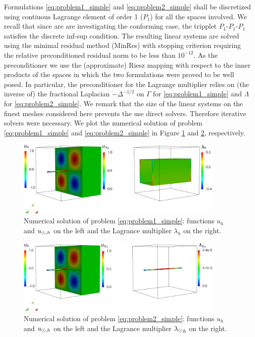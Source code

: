 Formulations \eqref{eq:problem1_simple} and \eqref{eq:problem2_simple} shall
be discretized using contiuous Lagrange element of order 1 ($P_1$) for all the spaces
involved. We recall that since are are investigating the conforming case, the tripplet
$P_1$-$P_1$-$P_1$ satisfies
the discrete inf-sup condition. The resulting linear systems are solved
using the minimal residual method (MinRes) with stopping criterion requiring the relative
preconditioned residual norm to be less than $10^{-12}$. As the preconditioner
we use the (approximate) Riesz mapping with respect to the inner products of
the spaces in which the two formulations were proved to be well posed.
In particular, the preconditioner for the Lagrange multiplier relies on
(the inverse of) the fractional Laplacian $-\Delta^{-1/2}$ on $\Gamma$ for
\eqref{eq:problem1_simple} and $\Lambda$ for \eqref{eq:problem2_simple}.
We remark that the size of the linear systems on the finest meshes considered
here prevents the use direct solvers. Therefore iterative solvers were necessary. We plot the numerical solution of problem \eqref{eq:problem1_simple} and \eqref{eq:problem2_simple} in Figure \ref{fig:sol_benchm1} and \ref{fig:sol_benchm2}, respectively. 

\begin{figure}
\centering
\includegraphics[width = 0.9\textwidth]{./graphics/mfs_LM2d}
\caption{Numerical solution of problem \eqref{eq:problem1_simple}: functions $u_h$ and $u_{\odot, h}$ on the left and the Lagrance multiplier $\lambda_h$ on the right.}\label{fig:sol_benchm1}
\end{figure}

\begin{figure}
\centering
\includegraphics[width = 0.9\textwidth]{./graphics/mfs_LM1d}
\caption{Numerical solution of problem \eqref{eq:problem2_simple}: functions $u_h$ and $u_{\odot, h}$ on the left and the Lagrance multiplier ${\lambda_{\odot}}_h$ on the right.}\label{fig:sol_benchm2}
\end{figure}

